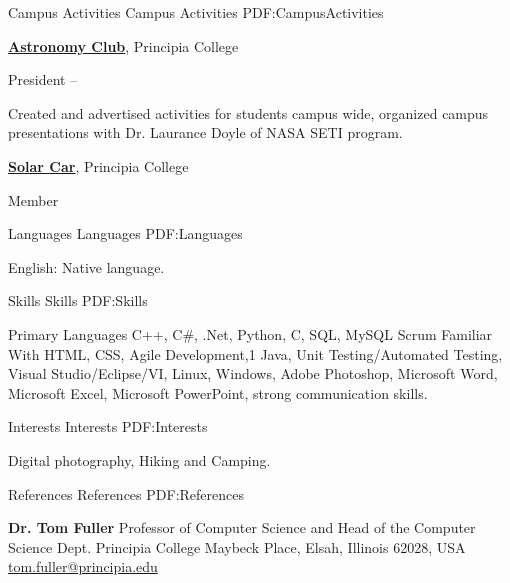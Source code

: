 \documentclass[a4paper,MMMyyyy,nonstopmode]{simpleresumecv}
\begin{document}
\begin{Body}
\begin{Detail}



\Section
{Campus Activities}
{Campus Activities}
{PDF:CampusActivities}

\Entry
\href{http://www.example.com/my-club}
{\textbf{Astronomy Club}},
Principia College

\Gap
\BulletItem
President
\hfill
{} --
\begin{Detail}
\SubBulletItem
Created and advertised activities for students campus wide, organized campus presentations with Dr. Laurance Doyle of NASA SETI program.

\Entry
\Gap
\href{https://www.principiasolarcar.com/}
{\textbf{Solar Car}},
Principia College

\BulletItem
Member
\end{Detail}


\Section
{Languages}
{Languages}
{PDF:Languages}

\BulletItem
English: Native language.


\Section
{Skills}
{Skills}
{PDF:Skills}

\Entry
\BulletItem Primary Languages
\SubBulletItem
C++,
C\#,
.Net,
Python,
C,
SQL, MySQL
Scrum
\Gap
\BulletItem Familiar With
\SubBulletItem
HTML, CSS,
Agile Development,1
Java,
Unit Testing/Automated Testing,
Visual Studio/Eclipse/VI,
Linux, Windows,
Adobe Photoshop,
Microsoft Word,
Microsoft Excel,
Microsoft PowerPoint,
strong communication skills.


\Section
{Interests}
{Interests}
{PDF:Interests}

\Entry
Digital photography,
Hiking and Camping.


\Section
{References}
{References}
{PDF:References}

\BulletItem
\textbf{Dr. Tom Fuller}
\newline
Professor of Computer Science and Head of the Computer Science Dept.
\newline
Principia College
 Maybeck Place, Elsah, Illinois 62028, USA
\newline
\href{mailto:tom.fuller@principia.edu}
{tom.fuller@principia.edu}



\end{Detail}
\end{Body}
\end{document}
